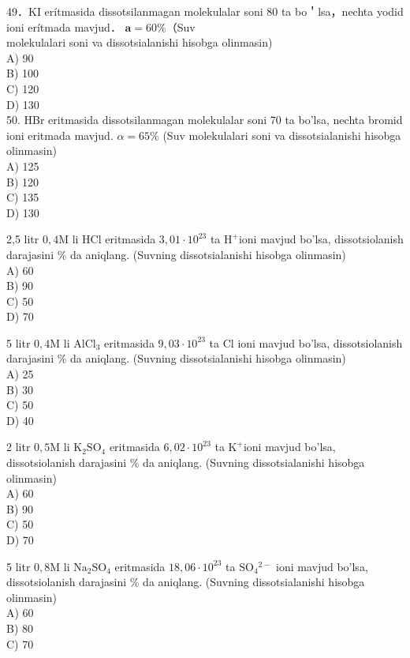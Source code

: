 49．KI erítmasida dissotsilanmagan molekulalar soni 80 ta bo＇lsa，nechta yodid ioni erítmada mavjud． $\mathbf{a}=60 \%$（Suv\\
molekulalari soni va dissotsialanishi hisobga olinmasin)\\
A) 90\\
B) 100\\
C) 120\\
D) 130\\
50. HBr eritmasida dissotsilanmagan molekulalar soni 70 ta bo'lsa, nechta bromid ioni eritmada mavjud. $\alpha=65 \%$ (Suv molekulalari soni va dissotsialanishi hisobga olinmasin)\\
A) 125\\
B) 120\\
C) 135\\
D) 130
  \item 2,5 litr $0,4 \mathrm{M}$ li HCl eritmasida $3,01 \cdot 10^{23}$ ta $\mathrm{H}^{+}$ioni mavjud bo'lsa, dissotsiolanish darajasini \% da aniqlang. (Suvning dissotsialanishi hisobga olinmasin)\\
A) 60\\
B) 90\\
C) 50\\
D) 70
  \item 5 litr $0,4 \mathrm{M}$ li $\mathrm{AlCl}_{3}$ eritmasida $9,03 \cdot 10^{23}$ ta Cl ioni mavjud bo'lsa, dissotsiolanish darajasini \% da aniqlang. (Suvning dissotsialanishi hisobga olinmasin)\\
A) 25\\
B) 30\\
C) 50\\
D) 40
  \item 2 litr $0,5 \mathrm{M}$ li $\mathrm{K}_{2} \mathrm{SO}_{4}$ eritmasida $6,02 \cdot 10^{23}$ ta $\mathrm{K}^{+}$ioni mavjud bo'lsa, dissotsiolanish darajasini \% da aniqlang. (Suvning dissotsialanishi hisobga olinmasin)\\
A) 60\\
B) 90\\
C) 50\\
D) 70
  \item 5 litr $0,8 \mathrm{M}$ li $\mathrm{Na}_{2} \mathrm{SO}_{4}$ eritmasida $18,06 \cdot 10^{23}$ ta $\mathrm{SO}_{4}{ }^{2-}$ ioni mavjud bo'lsa, dissotsiolanish darajasini \% da aniqlang. (Suvning dissotsialanishi hisobga olinmasin)\\
A) 60\\
B) 80\\
C) 70\\

